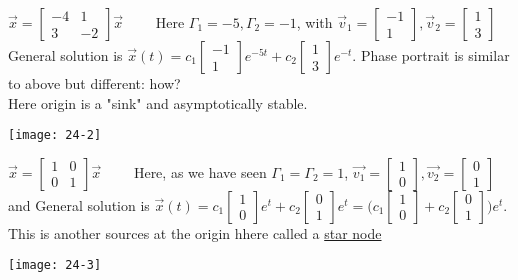 \begin{example-N}
	$\vec{x} = \begin{bmatrix}
		-4 & 1\\
		3 & -2
	\end{bmatrix} \vec{x} \quad \quad$ Here $\Gamma_1 = -5, \Gamma_2 = -1$, with $\vec{v}_1 = \begin{bmatrix}
		-1 \\1
	\end{bmatrix}, \vec{v}_2 = \begin{bmatrix}
		1 \\3
	\end{bmatrix}$\\
	General solution is $\vec{x}(t) = c_1 \begin{bmatrix}
		-1 \\1
	\end{bmatrix} e^{-5t} + c_2 \begin{bmatrix}
		1 \\3
	\end{bmatrix} e^{-t}$. Phase portrait is similar to above but different: how?\\
	Here origin is a "sink" and asymptotically stable.
	\begin{center}
		\texttt{[image: 24-2]}
	\end{center}
\end{example-N}
\begin{example-N}
	$\vec{x} = \begin{bmatrix}
		1 & 0\\
		0 & 1
	\end{bmatrix} \vec{x} \quad \quad$ Here, as we have seen $\Gamma_1 = \Gamma_2 = 1$, $\vec{v_1} = \begin{bmatrix}
		1\\0
	\end{bmatrix}, \vec{v_2} = \begin{bmatrix}
		0\\1
	\end{bmatrix}$ and General solution is $\vec{x}(t) = c_1 \begin{bmatrix}
		1\\0
	\end{bmatrix}e^t + c_2 \begin{bmatrix}
		0\\1
	\end{bmatrix} e^t = \bigg( c_1 \begin{bmatrix}
		1\\0
	\end{bmatrix} + c_2 \begin{bmatrix}
		0\\1
	\end{bmatrix} \bigg)e^t$.\\
	This is another sources at the origin hhere called a \underline{star node}
	\begin{center}
		\texttt{[image: 24-3]}
	\end{center}
\end{example-N}
